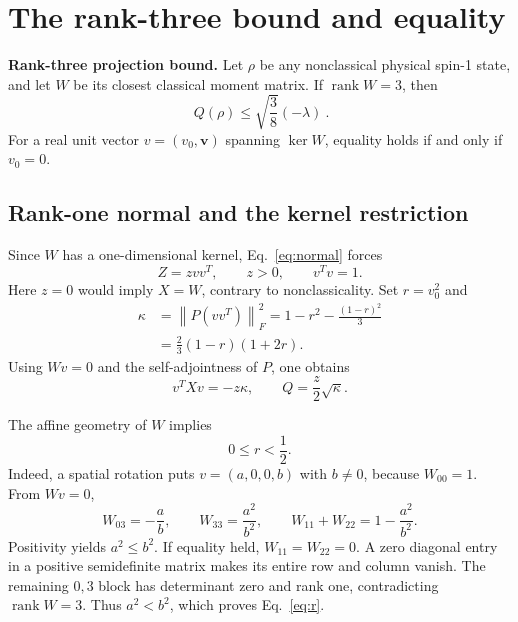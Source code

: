 \documentclass[aps,pra,reprint,amsmath,amssymb,superscriptaddress,longbibliography]{revtex4-2}
\newcommand{\rank}{\operatorname{rank}}
\newcommand{\norm}[1]{\left\lVert #1\right\rVert}
\begin{document}
\section{The rank-three bound and equality}
\label{sec:bound}

\noindent\textbf{Rank-three projection bound.}
Let \(\rho\) be any nonclassical physical spin-1 state, and let \(W\) be its closest classical moment matrix. If \(\rank W=3\), then
\begin{equation}
 \boxed{\ Q(\rho)\leq\sqrt{\frac38}(-\lambda)\ }.
 \label{eq:bound}
\end{equation}
For a real unit vector \(v=(v_0,\bm v)\) spanning \(\ker W\), equality holds if and only if \(v_0=0\).

\subsection{Rank-one normal and the kernel restriction}

Since \(W\) has a one-dimensional kernel, Eq.~\eqref{eq:normal} forces
\begin{equation}
 Z=zvv^T,\qquad z>0,\qquad v^Tv=1.
 \label{eq:dual}
\end{equation}
Here \(z=0\) would imply \(X=W\), contrary to nonclassicality. Set \(r=v_0^2\) and
\begin{align}
 \kappa&=\norm{P(vv^T)}_F^2
       =1-r^2-\frac{(1-r)^2}{3}\nonumber\\
       &=\frac23(1-r)(1+2r).
 \label{eq:kappa}
\end{align}
Using \(Wv=0\) and the self-adjointness of \(P\), one obtains
\begin{equation}
 v^TXv=-z\kappa,\qquad Q=\frac z2\sqrt{\kappa}.
 \label{eq:rayleighdata}
\end{equation}

The affine geometry of \(W\) implies
\begin{equation}
 0\leq r<\frac12.
 \label{eq:r}
\end{equation}
Indeed, a spatial rotation puts \(v=(a,0,0,b)\) with \(b\neq0\), because \(W_{00}=1\). From \(Wv=0\),
\begin{equation}
 W_{03}=-\frac ab,\qquad
 W_{33}=\frac{a^2}{b^2},\qquad
 W_{11}+W_{22}=1-\frac{a^2}{b^2}.
\end{equation}
Positivity yields \(a^2\leq b^2\). If equality held, \(W_{11}=W_{22}=0\). A zero diagonal entry in a positive semidefinite matrix makes its entire row and column vanish. The remaining \(0,3\) block has determinant zero and rank one, contradicting \(\rank W=3\). Thus \(a^2<b^2\), which proves Eq.~\eqref{eq:r}.
\end{document}
